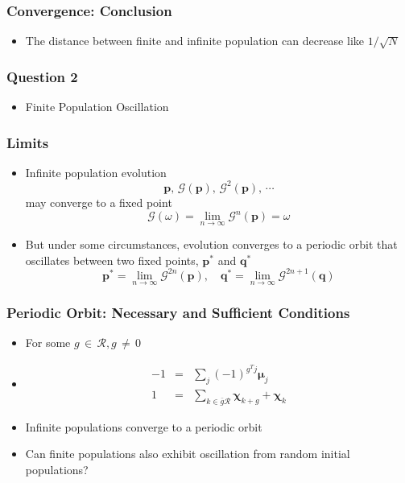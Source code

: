 \documentclass[aspectratio=169]{beamer}
\begin{document}
  \begin{frame}
    \frametitle{Convergence: Conclusion}
    \begin{itemize}
      \item The distance between finite and infinite population can decrease like $1/\sqrt{N}$    
    \end{itemize}
  \end{frame}
  
  \begin{frame}
    \frametitle{Question 2}
    \begin{itemize}
      \item{Finite Population Oscillation}      
    \end{itemize}
  \end{frame}
  
  \begin{frame}
    \frametitle{Limits}
    \begin{itemize}
      \item Infinite population evolution 
      \[
      \bm{p}, \, \mathcal{G}(\bm{p}), \, {\mathcal{G}}^2(\bm{p}), \, \cdots
      \]
      may converge to a fixed point      
      \[\mathcal{G}(\omega) = \lim_{n\to\infty} \mathcal{G}^n(\bm{p}) = \omega
      \]      
      \item{But under some circumstances, evolution converges to a periodic orbit that oscillates between two fixed points, $\bm{p}^\ast$ and $\bm{q}^\ast$}      
      \[
      \bm{p}^\ast = \lim_{n\to\infty} \mathcal{G}^{2n}(\bm{p})
      ,\quad
      \bm{q}^\ast = \lim_{n\to\infty} \mathcal{G}^{2n+1}(\bm{q})
      \]
    \end{itemize}
  \end{frame}
  
  \begin{frame}
    \frametitle{Periodic Orbit: Necessary and Sufficient Conditions}
    \begin{itemize}
      \item{For some $g \,\in\, \mathcal{R} , g \,\neq\, 0$}    
      \item{
      \begin{eqnarray*}
      -1 &=& \sum \limits_{j} (-1)^{g^T j} \bm{\mu}_j \\
      1 &=& \sum \limits_{k \in \bar{g}\mathcal{R}} \bm{\chi}_{k+g} + \bm{\chi}_k 
      \end{eqnarray*}
      }
      \item{Infinite populations converge to a periodic orbit }
      \item{Can finite populations also exhibit oscillation from random initial populations?}
    \end{itemize}
  \end{frame}  
  
\end{document}
